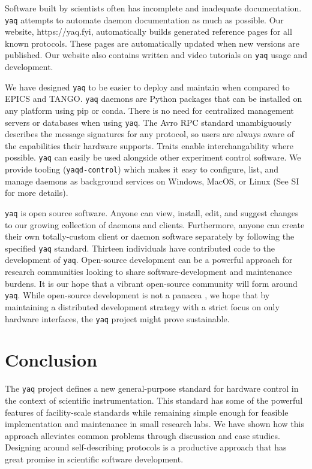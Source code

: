 \documentclass[aip, amsmath, amssymb, reprint,]{revtex4-2}
\newcommand\yaq{\texttt{yaq}}
\begin{document}
Software built by scientists often has incomplete and inadequate documentation. \cite{SegalJudith2007a}
\yaq{} attempts to automate daemon documentation as much as possible.
Our website, https://yaq.fyi, automatically builds generated reference pages for all known protocols.
These pages are automatically updated when new versions are published.
Our website also contains written and video tutorials on \yaq{} usage and development.

We have designed \yaq{} to be easier to deploy and maintain when compared to EPICS and TANGO.
\yaq{} daemons are Python packages that can be installed on any platform using pip or conda.
There is no need for centralized management servers or databases when using \yaq{}.
The Avro RPC standard unambiguously describes the message signatures for any protocol, so users are always aware of the capabilities their hardware supports.
Traits enable interchangability where possible.
\yaq{} can easily be used alongside other experiment control software.
We provide tooling (\texttt{yaqd-control}) which makes it easy to configure, list, and manage daemons as background services on Windows, MacOS, or Linux (See SI for more details).

\yaq{} is open source software.
Anyone can view, install, edit, and suggest changes to our growing collection of daemons and clients.
Furthermore, anyone can create their own totally-custom client or daemon software separately by following the specified \yaq{} standard.
Thirteen individuals have contributed code to the development of \yaq{}.
Open-source development can be a powerful approach for research communities looking to share software-development and maintenance burdens. \cite{CohenJeremy2021a}
It is our hope that a vibrant open-source community will form around \yaq{}.
While open-source development is not a panacea \cite{NowogrodzkiAnna2019a}, we hope that by maintaining a distributed development strategy with a strict focus on only hardware interfaces, the \yaq{} project might prove sustainable.

\section{Conclusion}

The \yaq{} project defines a new general-purpose standard for hardware control in the context of scientific instrumentation.
This standard has some of the powerful features of facility-scale standards while remaining simple enough for feasible implementation and maintenance in small research labs.
We have shown how this approach alleviates common problems through discussion and case studies.
Designing around self-describing protocols is a productive approach that has great promise in scientific software development.
\end{document}
